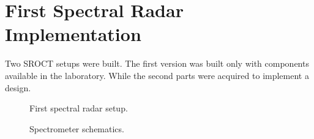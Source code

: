 \documentclass[12pt,twoside,english]{book}
\renewcommand{\~}{\perispomeni}%
\DeclareRobustCommand{\textgreek}[1]{\leavevmode{\greektext #1}}
\numberwithin{equation}{section}
\numberwithin{figure}{section}
\begin{document}
\section{First Spectral Radar Implementation}
\label{section:Spectral radar implementation}

Two SROCT setups were built. The first version was built only with components available in the laboratory. While the second parts were acquired to implement a design.  


\begin{figure}[h]
\small
\begin{minipage}[t]{0.48\textwidth}

\caption{First spectral radar setup.}
\label{fig:SROCT setup 1}
\end{minipage}
\hfill
\begin{minipage}[t]{0.48\textwidth}

\caption{Spectrometer schematics.}
\label{fig:spectrometer}
\end{minipage}
\end{figure}
\end{document}
